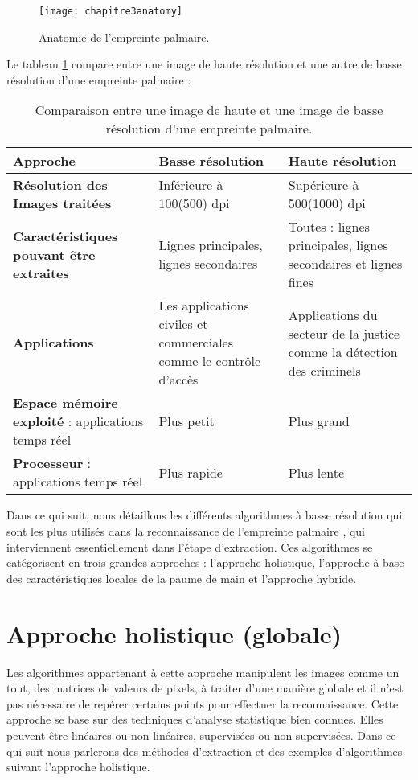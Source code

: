 \begin{center}
	\begin{figure}[H]
		\centering
		\texttt{[image: chapitre3anatomy]}
		\caption{Anatomie de l'empreinte palmaire.}
		\label{fig:chapitre3anatomy}
	\end{figure}
\end{center}
\clearpage
Le tableau \ref{tab:palmcomparaison} compare entre une image de haute résolution et une autre de basse résolution d'une empreinte palmaire :
\begin{table}[H]
	\centering
	
	\begin{tabular}{|p{5cm}|p{5cm}|p{5cm}|}
		\hline
		\textbf{Approche} & \textbf{Basse résolution} & \textbf{Haute résolution} \\ \hline
		\textbf{Résolution des Images traitées} & Inférieure à 100(500) dpi & Supérieure à 500(1000) dpi \\ \hline
		\textbf{Caractéristiques pouvant être extraites} & Lignes principales, lignes secondaires & Toutes : lignes principales, lignes secondaires et lignes fines \\ \hline
		\textbf{Applications} & Les applications civiles et commerciales comme le contrôle d'accès & Applications du secteur de la justice comme la détection des criminels \\ \hline
		\textbf{Espace mémoire exploité} : applications temps réel & Plus petit & Plus grand \\ \hline
		\textbf{Processeur }: applications temps réel & Plus rapide & Plus lente \\ \hline
	\end{tabular}
	\caption{Comparaison entre une image de haute et une image de basse résolution d'une empreinte palmaire.}
	\label{tab:palmcomparaison}
\end{table}
Dans ce qui suit, nous détaillons les différents algorithmes à basse résolution qui sont les plus utilisés dans la reconnaissance de l'empreinte palmaire \citep{kong2002palmprint}, qui interviennent essentiellement dans l'étape d'extraction. Ces algorithmes se catégorisent en trois grandes approches : l'approche holistique, l'approche à base des caractéristiques locales de la paume de main et l'approche hybride.
\section{Approche holistique (globale)}
Les algorithmes appartenant à cette approche manipulent les images comme un tout, des matrices de valeurs de pixels, à traiter d'une manière globale et il n'est pas nécessaire de repérer certains points \citep{meyer2009} pour effectuer la reconnaissance. Cette approche se base sur des techniques d'analyse statistique bien connues. Elles peuvent être linéaires ou non linéaires, supervisées ou non supervisées. Dans ce qui suit nous parlerons des méthodes d'extraction et des exemples d'algorithmes suivant l'approche holistique.
